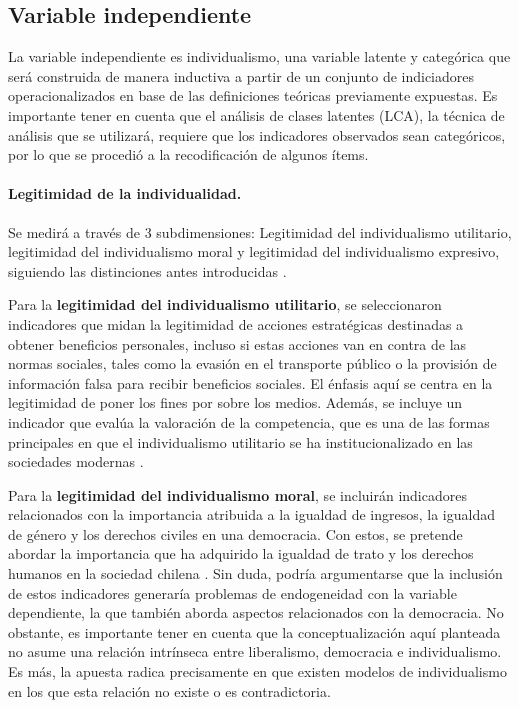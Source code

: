 \documentclass[12pt,twoside]{templates/facsothesis}
\begin{document}
\hypertarget{variable-independiente}{%
\subsection{Variable independiente}\label{variable-independiente}}

La variable independiente es individualismo, una variable latente y categórica que será construida de manera inductiva a partir de un conjunto de indiciadores operacionalizados en base de las definiciones teóricas previamente expuestas. Es importante tener en cuenta que el análisis de clases latentes (LCA), la técnica de análisis que se utilizará, requiere que los indicadores observados sean categóricos, por lo que se procedió a la recodificación de algunos ítems.

\hypertarget{legitimidad-de-la-individualidad.}{%
\paragraph{Legitimidad de la individualidad.}\label{legitimidad-de-la-individualidad.}}

Se medirá a través de 3 subdimensiones: Legitimidad del individualismo utilitario, legitimidad del individualismo moral y legitimidad del individualismo expresivo, siguiendo las distinciones antes introducidas \citep{cortois2018}.

Para la \textbf{legitimidad del individualismo utilitario}, se seleccionaron indicadores que midan la legitimidad de acciones estratégicas destinadas a obtener beneficios personales, incluso si estas acciones van en contra de las normas sociales, tales como la evasión en el transporte público o la provisión de información falsa para recibir beneficios sociales. El énfasis aquí se centra en la legitimidad de poner los fines por sobre los medios. Además, se incluye un indicador que evalúa la valoración de la competencia, que es una de las formas principales en que el individualismo utilitario se ha institucionalizado en las sociedades modernas \citep{cortois2018}.

Para la \textbf{legitimidad del individualismo moral}, se incluirán indicadores relacionados con la importancia atribuida a la igualdad de ingresos, la igualdad de género y los derechos civiles en una democracia. Con estos, se pretende abordar la importancia que ha adquirido la igualdad de trato y los derechos humanos en la sociedad chilena \citep{araujo2012, araujo2020a}. Sin duda, podría argumentarse que la inclusión de estos indicadores generaría problemas de endogeneidad con la variable dependiente, la que también aborda aspectos relacionados con la democracia. No obstante, es importante tener en cuenta que la conceptualización aquí planteada no asume una relación intrínseca entre liberalismo, democracia e individualismo. Es más, la apuesta radica precisamente en que existen modelos de individualismo en los que esta relación no existe o es contradictoria.
\end{document}
